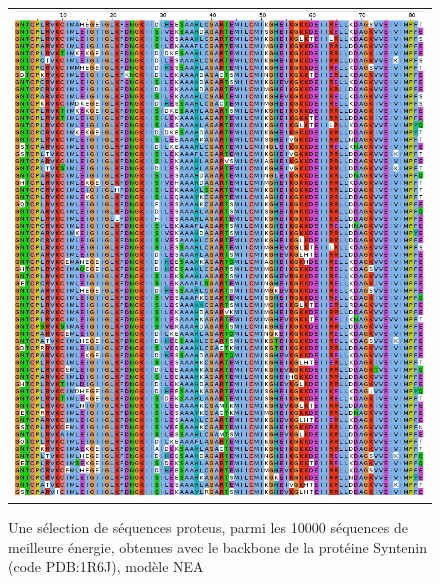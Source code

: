    \begin{figure}[t]
     \centering
     \begin{tabular}{c}
       \includegraphics[width=17cm]{proteus/1R6J.png} \\
     \end{tabular}
       \caption{Une sélection de séquences proteus, parmi les 10000 séquences de meilleure énergie, obtenues avec le backbone de la protéine Syntenin (code PDB:1R6J), modèle NEA}
\label{align_proteus:Syntenin}
   \end{figure}
\clearpage

